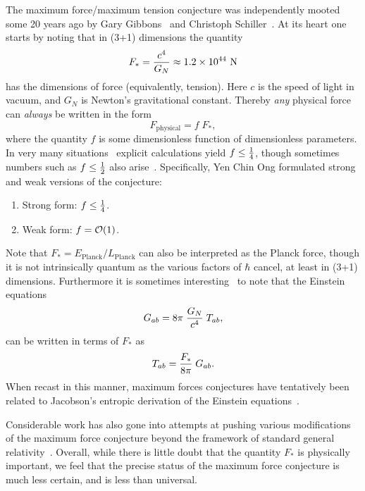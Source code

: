 \documentclass[12pt]{article}
\begin{document}
The maximum force/maximum tension conjecture was independently mooted some 20 years ago by Gary Gibbons~\cite{Gibbons2002} and Christoph Schiller~\cite{Schiller1997}.
At its heart one starts by noting that in (3+1) dimensions the quantity 
\begin{eqnarray}
    \label{eq:F_*} F_* =\frac{c^4}{G_N} \approx 1.2\times10^{44} \hbox{ N}
\end{eqnarray}
has the dimensions of force (equivalently, tension). Here $c$ is the speed of light in vacuum, and $G_N$ is Newton's gravitational constant. Thereby \emph{any} physical force can \emph{always} be written in the form 
\begin{equation}
F_\mathrm{physical} = f\; F_*,
\end{equation}
where the quantity $f$ is some dimensionless function of dimensionless parameters. 
In very many situations~\cite{Gibbons2002,Schiller1997,Barrow2014,Barrow2020} explicit calculations yield $f \leq {1\over4}$, though sometimes numbers such as $f\leq {1\over2}$ also arise~\cite{Yen2018}. Specifically, Yen Chin Ong \cite{Yen2018} formulated strong and weak versions of the conjecture:
%
 \begin{enumerate}
 \itemsep-1pt
\item {Strong form:} \quad $f\leq {1\over4}$.         
 \item {Weak form:} \quad $f = {\mathcal{O}}(1)$.
 \end{enumerate}
 Note that $F_* = E_\mathrm{Planck}/L_\mathrm{Planck}$ can also be interpreted as the Planck force, though it is not intrinsically quantum as the various factors of $\hbar$ cancel, at least in (3+1) dimensions. Furthermore it is sometimes interesting~\cite{Schiller2005} to note that the Einstein equations 
\begin{equation}
G_{ab}= 8\pi \; {G_N\over c^4}\; T_{ab},
\end{equation}
can be written in terms of $F_*$ as 
 \begin{equation}
T_{ab} = { F_*\over8\pi} \; G_{ab}.
\end{equation}
When recast in this manner, maximum forces conjectures have tentatively been related to Jacobson's entropic derivation of the Einstein equations~\cite{Jacobson-entropy}.

Considerable work has also gone into attempts at pushing various modifications of the maximum force conjecture beyond the framework of standard general relativity~\cite{Dabrowski2015,Bolotin2015}. 
Overall, while there is little doubt that the quantity $F_*$ is physically important, we feel that the precise status of the maximum force conjecture is much less certain, and is less than universal.
\end{document}

